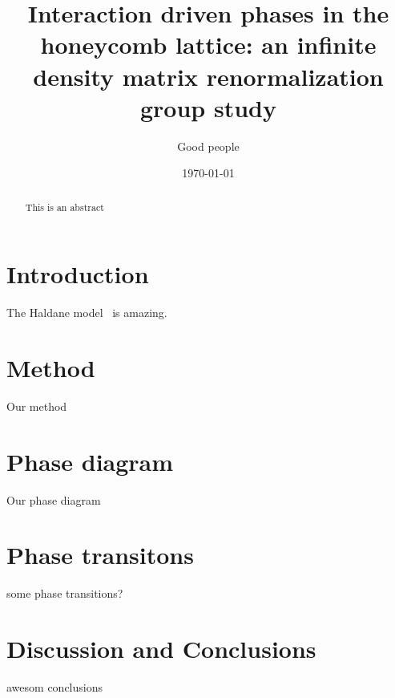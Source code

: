 \documentclass[aps,prx,10pt,twocolumn,floatfix,superscriptaddress,showpacs,numerical,footinbib]{revtex4-1}
\begin{document}
%
\title{Interaction driven phases in the honeycomb lattice: an infinite density matrix renormalization group study}
%
\author{Good people}
%
\date{\today}
%
\begin{abstract}
%
This is an abstract
%
\end{abstract}
%
\maketitle
%

\section{Introduction}
%
The Haldane model~\cite{H88} is amazing.
%
%
\section{Method}
%
Our method
%
\section{Phase diagram}
%
Our phase diagram
%
\section{Phase transitons}
%
some phase transitions?
%
\section{Discussion and Conclusions}
%
awesom conclusions


\end{document}
